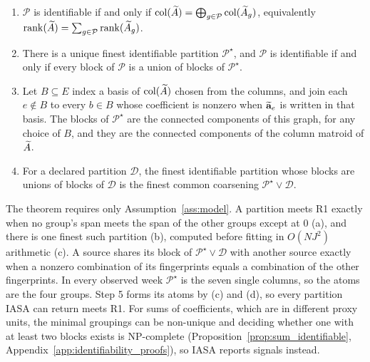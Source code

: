 \begin{theorem}
\label{thm:groupings}
\leavevmode
\begin{enumerate}[label=(\alph*),leftmargin=*,itemsep=0pt,topsep=2pt]
  \item \(\mathcal P\) is identifiable if and only if
  \(\operatorname{col}(\widetilde A)=\bigoplus_{g\in\mathcal P}\operatorname{col}(\widetilde A_g)\),
  equivalently \(\operatorname{rank}(\widetilde A)=\sum_{g\in\mathcal P}\operatorname{rank}(\widetilde A_g)\).
  \item There is a unique finest identifiable partition \(\mathcal P^\star\), and
  \(\mathcal P\) is identifiable if and only if every block of \(\mathcal P\) is a
  union of blocks of \(\mathcal P^\star\).
  \item Let \(B\subseteq E\) index a basis of \(\operatorname{col}(\widetilde A)\) chosen from
  the columns, and join each \(e\notin B\) to every \(b\in B\) whose coefficient is
  nonzero when \(\widetilde{\mathbf a}_e\) is written in that basis.  The blocks of \(\mathcal P^\star\)
  are the connected components of this graph, for any choice of \(B\), and they are the
  connected components of the column matroid of \(\widetilde A\).
  \item For a declared partition \(\mathcal D\), the finest identifiable partition
  whose blocks are unions of blocks of \(\mathcal D\) is the finest common coarsening
  \(\mathcal P^\star\vee\mathcal D\).
\end{enumerate}
\end{theorem}

\begin{remark}
The theorem requires only Assumption~\ref{ass:model}.  A partition meets R1 exactly when no
group's span meets the span of the other groups except at \(0\) (a), and there is one
finest such partition (b), computed before fitting in \(O(NJ^2)\) arithmetic (c).  A source
shares its block of \(\mathcal P^\star\vee\mathcal D\) with another source exactly when a
nonzero combination of its fingerprints equals a combination of the other
fingerprints.  In every observed week \(\mathcal P^\star\) is the seven single columns,
so the atoms are the four groups.  Step 5 forms its atoms by (c) and (d), so every
partition IASA can return meets R1.  For sums of coefficients, which are in different
proxy units, the minimal groupings can be non-unique and deciding whether one with at
least two blocks exists is NP-complete (Proposition~\ref{prop:sum_identifiable},
Appendix~\ref{app:identifiability_proofs}), so IASA reports signals instead.
\end{remark}

